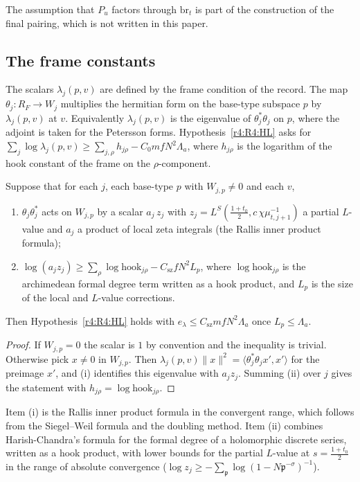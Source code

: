 The assumption that $P_u$ factors through $\mathrm{br}_t$ is part of the construction of the final pairing, which is not written in this paper.

\subsection{The frame constants}\label{w3:sec:HL}

The scalars $\lambda_j(p,v)$ are defined by the frame condition of the record. The map $\theta_j\colon R_F\to W_j$ multiplies the hermitian form on the base-type subspace $p$ by $\lambda_j(p,v)$ at $v$. Equivalently $\lambda_j(p,v)$ is the eigenvalue of $\theta_j^*\theta_j$ on $p$, where the adjoint is taken for the Petersson forms. Hypothesis~\ref{r4:R4:HL} asks for $\sum_j\log\lambda_j(p,v)\ge\sum_{j,\rho}h_{j\rho}-C_0mfN^2\Lambda_a$, where $h_{j\rho}$ is the logarithm of the hook constant of the frame on the $\rho$-component.

\begin{proposition}\label{w3:W3:HLprop}
Suppose that for each $j$, each base-type $p$ with $W_{j,p}\ne0$ and each $v$,
\begin{enumerate}
\item[(i)] $\theta_j\theta_j^*$ acts on $W_{j,p}$ by a scalar $a_j\,z_j$ with $z_j=L^S(\frac{1+t_0}2,c\,\chi\mu_{t,j+1}^{-1})$ a partial $L$-value and $a_j$ a product of local zeta integrals (the Rallis inner product formula);
\item[(ii)] $\log(a_jz_j)\ge\sum_\rho\log\mathrm{hook}_{j\rho}-C_{\mathrm{sz}}fN^2L_p$, where $\log\mathrm{hook}_{j\rho}$ is the archimedean formal degree term written as a hook product, and $L_p$ is the size of the local and $L$-value corrections.
\end{enumerate}
Then Hypothesis~\ref{r4:R4:HL} holds with $e_\lambda\le C_{\mathrm{sz}}mfN^2\Lambda_a$ once $L_p\le\Lambda_a$.
\end{proposition}

\begin{proof}
If $W_{j,p}=0$ the scalar is $1$ by convention and the inequality is trivial. Otherwise pick $x\ne0$ in $W_{j,p}$. Then $\lambda_j(p,v)\lVert x\rVert^2=\langle\theta_j^*\theta_jx',x'\rangle$ for the preimage $x'$, and (i) identifies this eigenvalue with $a_jz_j$. Summing (ii) over $j$ gives the statement with $h_{j\rho}=\log\mathrm{hook}_{j\rho}$.
\end{proof}

Item (i) is the Rallis inner product formula in the convergent range, which follows from the Siegel--Weil formula and the doubling method. Item (ii) combines Harish-Chandra's formula for the formal degree of a holomorphic discrete series, written as a hook product, with lower bounds for the partial $L$-value at $s=\frac{1+t_0}2$ in the range of absolute convergence ($\log z_j\ge-\sum_{\mathfrak p}\log(1-N\mathfrak p^{-\sigma})^{-1}$). 

